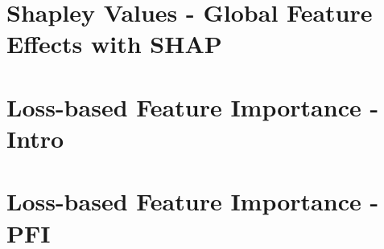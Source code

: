 \documentclass[11pt,compress,t,notes=noshow, aspectratio=169, xcolor=table]{beamer}
\begin{document}




\section{Shapley Values - Global Feature Effects with SHAP}
 
\section{Loss-based Feature Importance - Intro}


\section{Loss-based Feature Importance - PFI}

\end{document}
